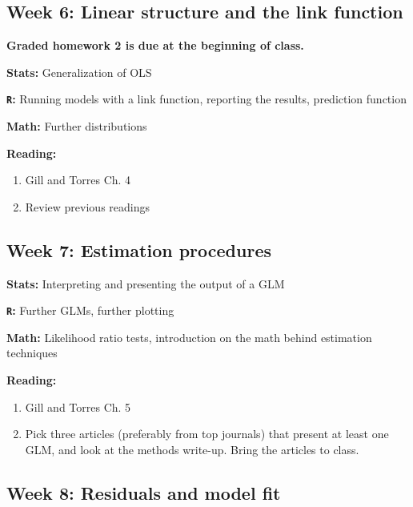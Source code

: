 \documentclass[12pt]{article}
\begin{document}
\subsection*{Week 6: Linear structure and the link function}

\noindent \textbf{Graded homework 2 is due at the beginning of class.}

\noindent \textbf{Stats:} Generalization of OLS

\noindent \textbf{\texttt{R}:} Running models with a link function, reporting the results, prediction function

\noindent \textbf{Math:} Further distributions

\noindent \textbf{Reading:}

\begin{enumerate}[1)]

\item Gill and Torres Ch. 4

\item Review previous readings

\end{enumerate}

\subsection*{Week 7: Estimation procedures}

\noindent \textbf{Stats:} Interpreting and presenting the output of a GLM

\noindent \textbf{\texttt{R}:} Further GLMs, further plotting

\noindent \textbf{Math:} Likelihood ratio tests, introduction on the math behind estimation techniques

\noindent \textbf{Reading:}

\begin{enumerate}[1)]

\item Gill and Torres Ch. 5

\item Pick three articles (preferably from top journals) that present at least one GLM, and look at the methods write-up. Bring the articles to class.

\end{enumerate}

\subsection*{Week 8: Residuals and model fit}
\end{document}
